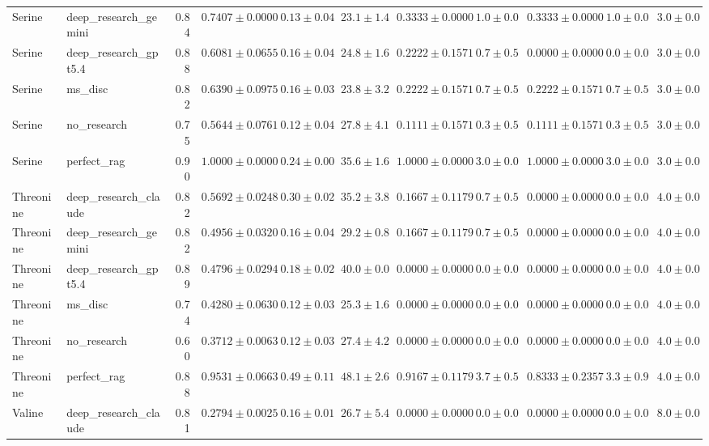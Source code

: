 \begin{table}[htbp]
\begin{tabular}{llrrrrrrrrr}
Serine & deep_research_gemini & 0.84 & $0.7407 \pm 0.0000$ & $0.13 \pm 0.04$ & $23.1 \pm 1.4$ & $0.3333 \pm 0.0000$ & $1.0 \pm 0.0$ & $0.3333 \pm 0.0000$ & $1.0 \pm 0.0$ & $3.0 \pm 0.0$ \\
Serine & deep_research_gpt5.4 & 0.88 & $0.6081 \pm 0.0655$ & $0.16 \pm 0.04$ & $24.8 \pm 1.6$ & $0.2222 \pm 0.1571$ & $0.7 \pm 0.5$ & $0.0000 \pm 0.0000$ & $0.0 \pm 0.0$ & $3.0 \pm 0.0$ \\
Serine & ms_disc & 0.82 & $0.6390 \pm 0.0975$ & $0.16 \pm 0.03$ & $23.8 \pm 3.2$ & $0.2222 \pm 0.1571$ & $0.7 \pm 0.5$ & $0.2222 \pm 0.1571$ & $0.7 \pm 0.5$ & $3.0 \pm 0.0$ \\
Serine & no_research & 0.75 & $0.5644 \pm 0.0761$ & $0.12 \pm 0.04$ & $27.8 \pm 4.1$ & $0.1111 \pm 0.1571$ & $0.3 \pm 0.5$ & $0.1111 \pm 0.1571$ & $0.3 \pm 0.5$ & $3.0 \pm 0.0$ \\
Serine & perfect_rag & 0.90 & \cellcolor{green!25}$1.0000 \pm 0.0000$ & $0.24 \pm 0.00$ & $35.6 \pm 1.6$ & $1.0000 \pm 0.0000$ & $3.0 \pm 0.0$ & $1.0000 \pm 0.0000$ & $3.0 \pm 0.0$ & $3.0 \pm 0.0$ \\
\midrule
Threonine & deep_research_claude & 0.82 & $0.5692 \pm 0.0248$ & $0.30 \pm 0.02$ & $35.2 \pm 3.8$ & $0.1667 \pm 0.1179$ & $0.7 \pm 0.5$ & $0.0000 \pm 0.0000$ & $0.0 \pm 0.0$ & $4.0 \pm 0.0$ \\
Threonine & deep_research_gemini & 0.82 & $0.4956 \pm 0.0320$ & $0.16 \pm 0.04$ & $29.2 \pm 0.8$ & $0.1667 \pm 0.1179$ & $0.7 \pm 0.5$ & $0.0000 \pm 0.0000$ & $0.0 \pm 0.0$ & $4.0 \pm 0.0$ \\
Threonine & deep_research_gpt5.4 & 0.89 & $0.4796 \pm 0.0294$ & $0.18 \pm 0.02$ & $40.0 \pm 0.0$ & $0.0000 \pm 0.0000$ & $0.0 \pm 0.0$ & $0.0000 \pm 0.0000$ & $0.0 \pm 0.0$ & $4.0 \pm 0.0$ \\
Threonine & ms_disc & 0.74 & $0.4280 \pm 0.0630$ & $0.12 \pm 0.03$ & $25.3 \pm 1.6$ & $0.0000 \pm 0.0000$ & $0.0 \pm 0.0$ & $0.0000 \pm 0.0000$ & $0.0 \pm 0.0$ & $4.0 \pm 0.0$ \\
Threonine & no_research & 0.60 & \cellcolor{red!25}$0.3712 \pm 0.0063$ & $0.12 \pm 0.03$ & $27.4 \pm 4.2$ & $0.0000 \pm 0.0000$ & $0.0 \pm 0.0$ & $0.0000 \pm 0.0000$ & $0.0 \pm 0.0$ & $4.0 \pm 0.0$ \\
Threonine & perfect_rag & 0.88 & \cellcolor{green!25}$0.9531 \pm 0.0663$ & $0.49 \pm 0.11$ & $48.1 \pm 2.6$ & $0.9167 \pm 0.1179$ & $3.7 \pm 0.5$ & $0.8333 \pm 0.2357$ & $3.3 \pm 0.9$ & $4.0 \pm 0.0$ \\
\midrule
Valine & deep_research_claude & 0.81 & $0.2794 \pm 0.0025$ & $0.16 \pm 0.01$ & $26.7 \pm 5.4$ & $0.0000 \pm 0.0000$ & $0.0 \pm 0.0$ & $0.0000 \pm 0.0000$ & $0.0 \pm 0.0$ & $8.0 \pm 0.0$ \\

\end{tabular}
\end{table}
